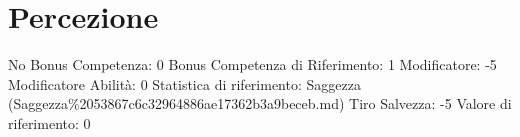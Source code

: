 \section{Percezione}\label{percezione}

\begin{description}
\tightlist
\item[Tags: ABI]
No Bonus Competenza: 0 Bonus Competenza di Riferimento: 1 Modificatore:
-5 Modificatore Abilità: 0 Statistica di riferimento: Saggezza
(Saggezza\%2053867c6c32964886ae17362b3a9beceb.md) Tiro Salvezza: -5
Valore di riferimento: 0
\end{description}
